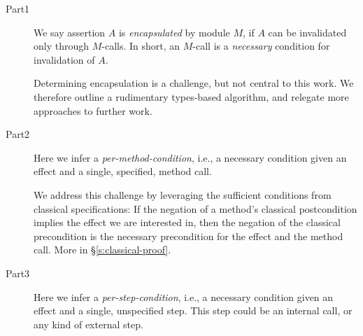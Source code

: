 \begin{description}
\item[Part1] 
We  say assertion $A$  is
\emph{encapsulated} by  module $M$, if  $A$ can be invalidated only through
  $M$-\internalC calls. In short, an $M$-\internalC call is a \emph{necessary} condition for
invalidation of $A$.

Determining encapsulation is a challenge, but not central to this work.
We therefore outline a rudimentary types-based algorithm, and relegate more
approaches to further work.
  
\item[Part2]
 Here we infer a \emph{per-method-condition}, i.e., a 
 necessary condition given an effect and
a single, specified, method call. 
% 

We address this  challenge %
 by leveraging the sufficient conditions from classical specifications:
If the negation of a method's
 classical postcondition implies  the effect we are interested in, then the negation of the 
 classical precondition  is the necessary precondition for the effect and the method call.
More in \S\ref{s:classical-proof}.  



  
\item[Part3]
Here we infer a \emph{per-step-condition}, i.e., a 
 necessary condition given an effect and
a single, unspecified step. This step could be an internal call, or any kind of external step.



\end{description}
